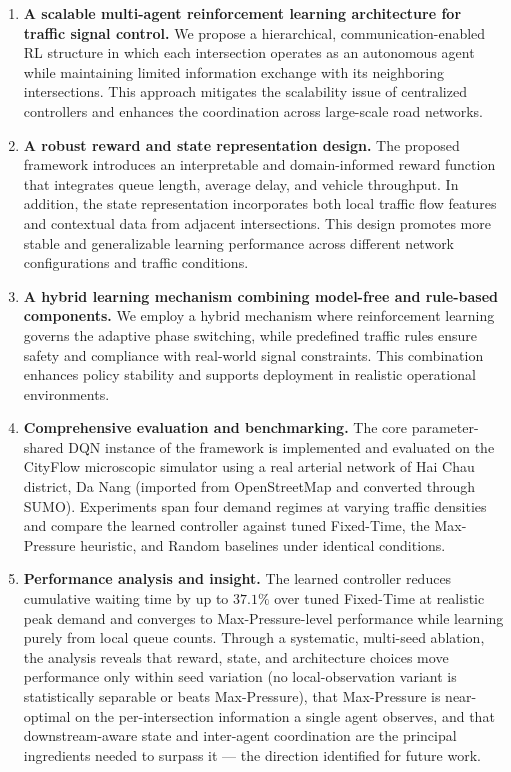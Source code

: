 \documentclass[12pt]{report} %
\begin{document}
\begin{enumerate}
    \item \textbf{A scalable multi-agent reinforcement learning architecture for traffic signal control.}  
    We propose a hierarchical, communication-enabled RL structure in which each intersection operates as an autonomous agent while maintaining limited information exchange with its neighboring intersections. This approach mitigates the scalability issue of centralized controllers and enhances the coordination across large-scale road networks.

    \item \textbf{A robust reward and state representation design.}  
    The proposed framework introduces an interpretable and domain-informed reward function that integrates queue length, average delay, and vehicle throughput. In addition, the state representation incorporates both local traffic flow features and contextual data from adjacent intersections. This design promotes more stable and generalizable learning performance across different network configurations and traffic conditions.

    \item \textbf{A hybrid learning mechanism combining model-free and rule-based components.}  
    We employ a hybrid mechanism where reinforcement learning governs the adaptive phase switching, while predefined traffic rules ensure safety and compliance with real-world signal constraints. This combination enhances policy stability and supports deployment in realistic operational environments.

    \item \textbf{Comprehensive evaluation and benchmarking.}
    The core parameter-shared DQN instance of the framework is implemented and evaluated on the CityFlow microscopic simulator using a real arterial network of Hai Chau district, Da Nang (imported from OpenStreetMap and converted through SUMO). Experiments span four demand regimes at varying traffic densities and compare the learned controller against tuned Fixed-Time, the Max-Pressure heuristic, and Random baselines under identical conditions.

    \item \textbf{Performance analysis and insight.}
    The learned controller reduces cumulative waiting time by up to $37.1\%$ over tuned Fixed-Time at realistic peak demand and converges to Max-Pressure-level performance while learning purely from local queue counts. Through a systematic, multi-seed ablation, the analysis reveals that reward, state, and architecture choices move performance only within seed variation (no local-observation variant is statistically separable or beats Max-Pressure), that Max-Pressure is near-optimal on the per-intersection information a single agent observes, and that downstream-aware state and inter-agent coordination are the principal ingredients needed to surpass it --- the direction identified for future work.
\end{enumerate}
\end{document}
